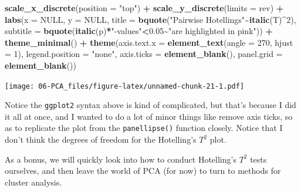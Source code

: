 \documentclass[
]{book}
\newenvironment{Shaded}{\begin{snugshade}}{\end{snugshade}}
\newcommand{\AttributeTok}[1]{\textcolor[rgb]{0.13,0.29,0.53}{#1}}
\newcommand{\ConstantTok}[1]{\textcolor[rgb]{0.56,0.35,0.01}{#1}}
\newcommand{\DecValTok}[1]{\textcolor[rgb]{0.00,0.00,0.81}{#1}}
\newcommand{\FloatTok}[1]{\textcolor[rgb]{0.00,0.00,0.81}{#1}}
\newcommand{\FunctionTok}[1]{\textcolor[rgb]{0.13,0.29,0.53}{\textbf{#1}}}
\newcommand{\NormalTok}[1]{#1}
\newcommand{\SpecialCharTok}[1]{\textcolor[rgb]{0.81,0.36,0.00}{\textbf{#1}}}
\newcommand{\StringTok}[1]{\textcolor[rgb]{0.31,0.60,0.02}{#1}}
\begin{document}
\begin{Shaded}
\begin{Highlighting}[]
  \FunctionTok{scale\_x\_discrete}\NormalTok{(}\AttributeTok{position =} \StringTok{"top"}\NormalTok{) }\SpecialCharTok{+} 
  \FunctionTok{scale\_y\_discrete}\NormalTok{(}\AttributeTok{limits =}\NormalTok{ rev) }\SpecialCharTok{+} 
  \FunctionTok{labs}\NormalTok{(}\AttributeTok{x =} \ConstantTok{NULL}\NormalTok{, }
       \AttributeTok{y =} \ConstantTok{NULL}\NormalTok{,}
       \AttributeTok{title =} \FunctionTok{bquote}\NormalTok{(}\StringTok{"Pairwise Hotelling\textquotesingle{}s"}\SpecialCharTok{\textasciitilde{}}\FunctionTok{italic}\NormalTok{(T)}\SpecialCharTok{\^{}}\DecValTok{2}\NormalTok{),}
       \AttributeTok{subtitle =} \FunctionTok{bquote}\NormalTok{(}\FunctionTok{italic}\NormalTok{(p)}\SpecialCharTok{*}\StringTok{"{-}values"}\SpecialCharTok{\textless{}}\FloatTok{0.05}\SpecialCharTok{\textasciitilde{}}\StringTok{"are highlighted in pink"}\NormalTok{)) }\SpecialCharTok{+} 
  \FunctionTok{theme\_minimal}\NormalTok{() }\SpecialCharTok{+} 
  \FunctionTok{theme}\NormalTok{(}\AttributeTok{axis.text.x =} \FunctionTok{element\_text}\NormalTok{(}\AttributeTok{angle =} \DecValTok{270}\NormalTok{, }\AttributeTok{hjust =} \DecValTok{1}\NormalTok{),}
        \AttributeTok{legend.position =} \StringTok{"none"}\NormalTok{,}
        \AttributeTok{axis.ticks =} \FunctionTok{element\_blank}\NormalTok{(),}
        \AttributeTok{panel.grid =} \FunctionTok{element\_blank}\NormalTok{())}
\end{Highlighting}
\end{Shaded}

\texttt{[image: 06-PCA\_files/figure-latex/unnamed-chunk-21-1.pdf]}

Notice the \texttt{ggplot2} syntax above is kind of complicated, but that's because I did it all at once, and I wanted to do a lot of minor things like remove axis ticks, so as to replicate the plot from the \texttt{panellipse()} function closely. Notice that I don't think the degrees of freedom for the Hotelling's \(T^2\) plot.

As a bonus, we will quickly look into how to conduct Hotelling's \(T^2\) tests ourselves, and then leave the world of PCA (for now) to turn to methods for cluster analysis.
\end{document}
